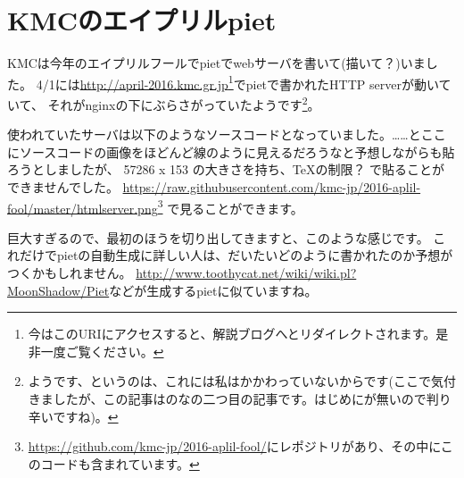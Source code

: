 \chapter[KMCのエイプリルpiet]{KMCのエイプリルpiet}

KMCは今年のエイプリルフールでpietでwebサーバを書いて(描いて？)いました。
4/1には\url{http://april-2016.kmc.gr.jp}\footnote{今はこのURIにアクセスすると、解説ブログへとリダイレクトされます。是非一度ご覧ください。}でpietで書かれたHTTP serverが動いていて、
それがnginxの下にぶらさがっていたようです\footnote{ようです、というのは、これには私はかかわっていないからです(ここで気付きましたが、この記事はのなの二つ目の記事です。はじめにが無いので判り辛いですね)。}。

使われていたサーバは以下のようなソースコードとなっていました。……とここにソースコードの画像をほどんど線のように見えるだろうなと予想しながらも貼ろうとしましたが、
57286 x 153 の大きさを持ち、\TeX の制限？ で貼ることができませんでした。
\url{https://raw.githubusercontent.com/kmc-jp/2016-aplil-fool/master/htmlserver.png}\footnote{\url{https://github.com/kmc-jp/2016-aplil-fool/}にレポジトリがあり、その中にこのコードも含まれています。}
で見ることができます。

巨大すぎるので、最初のほうを切り出してきますと、このような感じです。
これだけでpietの自動生成に詳しい人は、だいたいどのように書かれたのか予想がつくかもしれません。
\url{http://www.toothycat.net/wiki/wiki.pl?MoonShadow/Piet}などが生成するpietに似ていますね。

